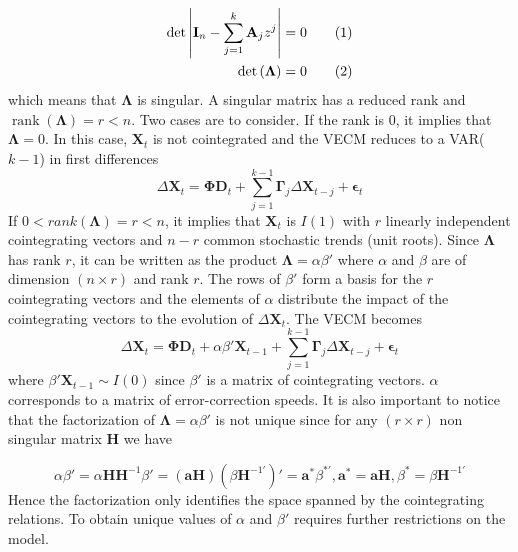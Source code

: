 \documentclass[11pt,a4,twosided,singlespacing,titlepagenumber=on]{scrreprt}
\numberwithin{equation}{chapter} %
\theoremstyle{remark}
\DeclareMathOperator{\rank}{rank}
\newcommand{\matr}[1]{\mathbf{#1}}
\newcommand\numberthis{\addtocounter{equation}{1}\tag{\theequation}}
\begin{document}
\begin{align*}
\text{det} \left|\matr{I}_n - \sum_{j=1}^k \matr{A}_j z^j \right| = 0 \numberthis \\
\text{det} \left(\matr{\Lambda} \right) = 0 \numberthis
\end{align*}
which means that $\matr{\Lambda}$ is singular. A singular matrix has a reduced rank and $\rank(\matr{\Lambda}) = r < n$. Two cases are to consider. If the rank is 0, it implies that $\matr{\Lambda} = 0$. In this case, $\matr{X}_t$ is not cointegrated and the VECM reduces to a VAR($k-1$) in first differences
\begin{equation}
\Delta \matr{X}_t = \matr{\Phi} \matr{D}_t + \sum_{j=1}^{k-1} \matr{\Gamma}_j \Delta \matr{X}_{t-j} + \matr{\epsilon}_t
\end{equation}
If $0 < rank(\matr{\Lambda}) = r < n$, it implies that $\matr{X}_t$ is $I(1)$ with $r$ linearly independent cointegrating vectors and $n-r$ common stochastic trends (unit roots). Since $\matr{\Lambda}$ has rank $r$, it can be written as the product $\matr{\Lambda} = \alpha \beta'$ where $\alpha$ and $\beta$ are of dimension $(n \times r)$ and rank $r$.  The rows of $\beta'$ form a basis for the $r$ cointegrating vectors and the elements of $\alpha$ distribute the impact of the cointegrating vectors to the evolution of $\Delta \matr{X}_t$. The VECM becomes
\begin{equation}
\Delta \matr{X}_t = \matr{\Phi} \matr{D}_t + \alpha \beta' \matr{X}_{t-1} + \sum_{j=1}^{k-1} \matr{\Gamma}_j \Delta \matr{X}_{t-j} + \matr{\epsilon}_t
\end{equation}
where $\beta' \matr{X}_{t-1} \sim I(0)$ since $\beta'$ is a matrix of cointegrating vectors. $\alpha$ corresponds to a matrix of error-correction speeds. It is also important to notice that the factorization of $\matr{\Lambda} = \alpha \beta'$ is not unique since for any $(r \times r)$ non singular matrix $\matr{H}$ we have

\begin{equation}
\alpha \beta' = \alpha \matr{H} \matr{H}^{-1} \beta' = (\matr{a}\matr{H})(\beta \matr{H}^{-1'})' = \matr{a}^* \beta^{*'}, \matr{a}^* = \matr{a}\matr{H}, \beta^* = \beta \matr{H}^{-1'}
\end{equation}
Hence the factorization only identifies the space spanned by the cointegrating relations. To obtain unique values of $\alpha$ and $\beta'$ requires further restrictions on the model. \\
\end{document}
